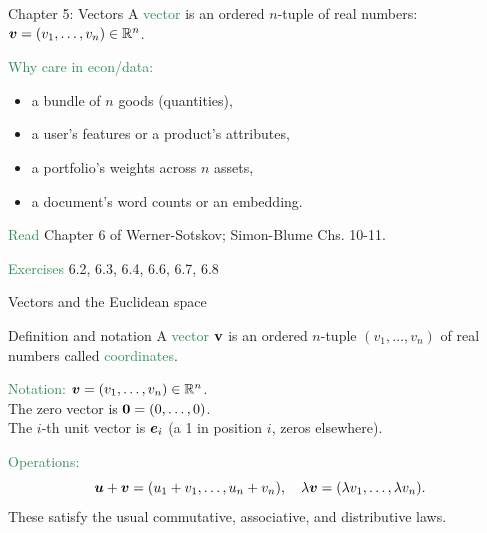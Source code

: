 \documentclass[11pt]{beamer}
\begin{document}

\begin{frame}{Chapter 5: Vectors}
A \textcolor{SeaGreen}{vector} is an ordered $n$-tuple of real numbers: $\boldsymbol v=(v_1,\ldots,v_n)\in\mathbb{R}^n$.
\bigskip

\textcolor{SeaGreen}{Why care in econ/data:}
\begin{itemize}
\item a bundle of $n$ goods (quantities),
\item a user's features or a product's attributes,
\item a portfolio's weights across $n$ assets,
\item a document's word counts or an embedding.
\end{itemize}
\bigskip

\textcolor{SeaGreen}{Read} Chapter 6 of Werner-Sotskov; Simon-Blume Chs. 10-11. 
\bigskip

\textcolor{SeaGreen}{Exercises} 6.2, 6.3, 6.4, 6.6, 6.7, 6.8
\end{frame}

\begin{frame} \begin{center}
	\alert{\Huge Vectors and the Euclidean space}
\end{center}\end{frame}




\begin{frame}{Definition and notation}
A \textcolor{SeaGreen}{vector} ${\bf v}$ is an ordered $n$-tuple $(v_1,\dots,v_n)$ of real numbers called \textcolor{SeaGreen}{coordinates}.
\bigskip

\textcolor{SeaGreen}{Notation:} $\boldsymbol v=(v_1,\ldots,v_n)\in\mathbb{R}^n$.\\ \quad\quad\quad\;\quad The zero vector is $\boldsymbol 0=(0,\ldots,0)$.\\ 
\quad\quad\quad\;\quad The $i$-th unit vector is $\boldsymbol e_i$ (a 1 in position $i$, zeros elsewhere).
\bigskip

\textcolor{SeaGreen}{Operations:}
\[
\boldsymbol u+\boldsymbol v=(u_1+v_1,\ldots,u_n+v_n),\quad
\lambda\boldsymbol v=(\lambda v_1,\ldots,\lambda v_n).
\]
These satisfy the usual commutative, associative, and distributive laws.\\[4mm]
\end{frame}
\end{document}
